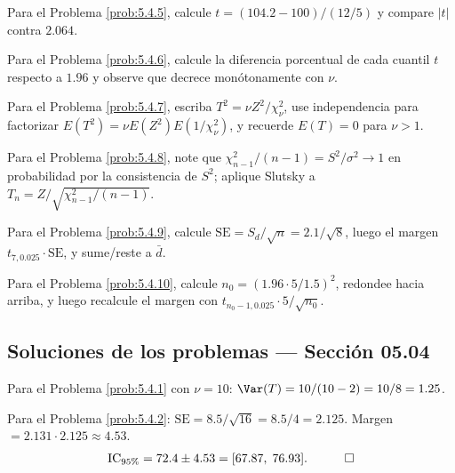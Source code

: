 \begin{sugerencia}
	\label{sug:5.4.5}
	Para el Problema \ref{prob:5.4.5}, calcule $t=(104.2-100)/(12/5)$ y compare $|t|$ contra $2.064$.
\end{sugerencia}

\begin{sugerencia}
	\label{sug:5.4.6}
	Para el Problema \ref{prob:5.4.6}, calcule la diferencia porcentual de cada cuantil $t$ respecto a $1.96$ y observe que decrece monótonamente con $\nu$.
\end{sugerencia}

\begin{sugerencia}
	\label{sug:5.4.7}
	Para el Problema \ref{prob:5.4.7}, escriba $T^2=\nu Z^2/\chi^2_\nu$, use independencia para factorizar $E(T^2)=\nu E(Z^2)E(1/\chi^2_\nu)$, y recuerde $E(T)=0$ para $\nu>1$.
\end{sugerencia}

\begin{sugerencia}
	\label{sug:5.4.8}
	Para el Problema \ref{prob:5.4.8}, note que $\chi^2_{n-1}/(n-1)=S^2/\sigma^2 \to 1$ en probabilidad por la consistencia de $S^2$; aplique Slutsky a $T_n=Z/\sqrt{\chi^2_{n-1}/(n-1)}$.
\end{sugerencia}

\begin{sugerencia}
	\label{sug:5.4.9}
	Para el Problema \ref{prob:5.4.9}, calcule $\text{SE}=S_d/\sqrt n = 2.1/\sqrt 8$, luego el margen $t_{7,0.025}\cdot\text{SE}$, y sume/reste a $\bar d$.
\end{sugerencia}

\begin{sugerencia}
	\label{sug:5.4.10}
	Para el Problema \ref{prob:5.4.10}, calcule $n_0=(1.96\cdot 5/1.5)^2$, redondee hacia arriba, y luego recalcule el margen con $t_{n_0-1,0.025}\cdot 5/\sqrt{n_0}$.
\end{sugerencia}

\subsection*{Soluciones de los problemas --- Sección 05.04}

\begin{solucion}
	\label{sol:5.4.1}
	Para el Problema \ref{prob:5.4.1} con $\nu=10$: $\Var(T) = 10/(10-2) = 10/8 = 1.25$. \quad \qedhere
\end{solucion}

\begin{solucion}
	\label{sol:5.4.2}
	Para el Problema \ref{prob:5.4.2}: $\text{SE}=8.5/\sqrt{16}=8.5/4=2.125$. Margen $=2.131\cdot 2.125\approx 4.53$.
	\begin{align*}
		\text{IC}_{95\%} = 72.4 \pm 4.53 = [67.87,\; 76.93]. \quad \qedhere
	\end{align*}
\end{solucion}

